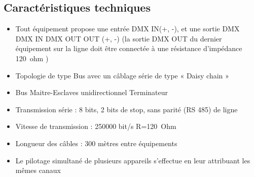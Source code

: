 \subsection{Caractéristiques techniques}
\begin{itemize}
    \item Tout équipement propose une entrée DMX IN(+, -), et une sortie DMX DMX IN
    DMX OUT
    OUT (+, -) (la sortie DMX OUT du dernier équipement sur la ligne doit
    être connectée à une résistance d’impédance \SI{120}{ohm} )
    \item Topologie de type Bus avec un câblage série de type « Daisy chain »
    \item Bus Maitre-Esclaves unidirectionnel
    Terminateur
    \item Transmission série : 8 bits, 2 bits de stop, sans parité (RS 485)
    de ligne
    \item Vitesse de transmission : 250000 bit/s
    R=\SI{120}{Ohm}
    \item Longueur des câbles : 300 mètres entre équipements
    \item Le pilotage simultané de plusieurs appareils s’effectue en leur attribuant
    les mêmes canaux
\end{itemize}




